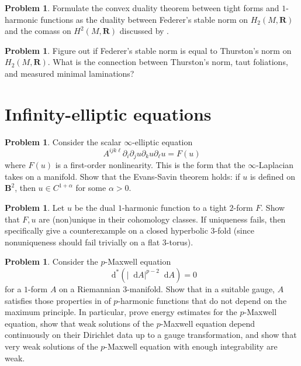 \documentclass[reqno,11pt]{amsart}
\newcommand{\RR}{\mathbf{R}}
\newcommand{\Ball}{\mathbf{B}}
\newcommand*\dif{\mathop{}\!\mathrm{d}}
\theoremstyle{definition}
\newtheorem{problem}[theorem]{Problem}
\numberwithin{equation}{section}
\begin{document}
\begin{problem}
Formulate the convex duality theorem between tight forms and $1$-harmonic functions as the duality between Federer's stable norm on $H_2(M, \RR)$ and the comass on $H^2(M, \RR)$ discussed by \cite[\S2]{bangert_cui_2017}.
\end{problem}

\begin{problem}
Figure out if Federer's stable norm is equal to Thurston's norm on $H_2(M, \RR)$.
What is the connection between Thurston's norm, taut foliations, and measured minimal laminations?
\end{problem}

\section{Infinity-elliptic equations}
\begin{problem}
Consider the scalar $\infty$-elliptic equation 
$$A^{ijk\ell} \partial_i \partial_j u \partial_k u \partial_\ell u = F(u)$$
where $F(u)$ is a first-order nonlinearity.
This is the form that the $\infty$-Laplacian takes on a manifold.
Show that the Evans-Savin theorem \cite{Evans08} holds: if $u$ is defined on $\Ball^2$, then $u \in C^{1 + \alpha}$ for some $\alpha > 0$.
\end{problem}

\begin{problem}
Let $u$ be the dual $1$-harmonic function to a tight $2$-form $F$.
Show that $F, u$ are (non)unique in their cohomology classes.
If uniqueness fails, then specifically give a counterexample on a closed hyperbolic $3$-fold (since nonuniqueness should fail trivially on a flat $3$-torus).
\end{problem}

\begin{problem}
Consider the $p$-Maxwell equation 
$$\dif^*(|\dif A|^{p - 2} \dif A) = 0$$
for a $1$-form $A$ on a Riemannian $3$-manifold.
Show that in a suitable gauge, $A$ satisfies those properties in \cite[Chapters 10 and 11]{kinnunen2021maximal} of $p$-harmonic functions that do not depend on the maximum principle.
In particular, prove energy estimates for the $p$-Maxwell equation, show that weak solutions of the $p$-Maxwell equation depend continuously on their Dirichlet data up to a gauge transformation, and show that very weak solutions of the $p$-Maxwell equation with enough integrability are weak.
\end{problem}
\end{document}
